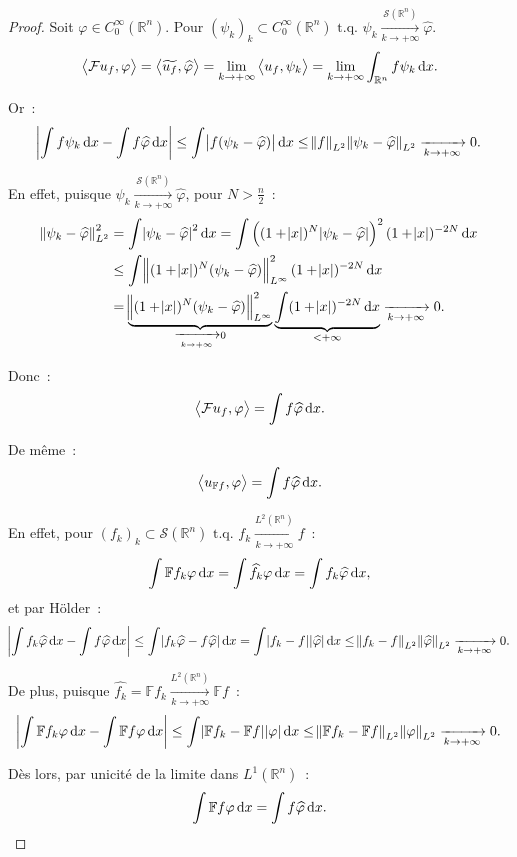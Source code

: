 \documentclass{report}
\newcommand{\R}{{\mathbb R}}
\newcommand{\scpr}[2]{\left\langle#1, #2\right\rangle}
\newcommand{\tq}{\text{ t.q. }}
\newcommand{\st}{\tq}
\newcommand{\pinfty}{{+\infty}}
\theoremstyle{definition}
\theoremstyle{remark}
\begin{document}
\begin{proof} Soit $\varphi \in C^\infty_0(\R^n)$. Pour $(\psi_k)_k \subset C^\infty_0(\R^n) \st \psi_k \xrightarrow[k \to \pinfty]{\mathcal S(\R^n)} \widehat {\varphi}$.
\[\scpr {\mathcal Fu_f}\varphi = \scpr {\widetilde {u_f}}{\widehat \varphi} = \lim_{k \to \pinfty}\scpr {u_f}{\psi_k} = \lim_{k \to \pinfty}\int_{\R^n}f\psi_k\dif x.\]

Or~:
\[\abs {\int f\psi_k\dif x - \int f\widehat \varphi\dif x} \leq \int\abs {f(\psi_k - \widehat \varphi)}\dif x
	\leq \norm f_{L^2}\norm {\psi_k-\widehat \varphi}_{L^2} \xrightarrow[k \to \pinfty]{} 0.\]

En effet, puisque $\psi_k \xrightarrow[k \to \pinfty]{\mathcal S(\R^n)} \widehat \varphi$, pour $N > \frac n2$~:
\begin{align*}
	\norm {\psi_k - \widehat \varphi}_{L^2}^2 &= \int\abs {\psi_k-\widehat \varphi}^2\dif x = \int\left((1+\abs x)^N\abs {\psi_k-\widehat \varphi}\right)^2(1+\abs x)^{-2N}\dif x \\
	&\leq \int\norm {(1+\abs x)^N(\psi_k-\widehat\varphi)}_{L^\infty}^2(1+\abs x)^{-2N}\dif x \\
	&= \underbrace {\norm {(1+\abs x)^N(\psi_k-\widehat\varphi)}_{L^\infty}^2}_{\xrightarrow[k \to \pinfty]{} 0}\underbrace{\int(1+\abs x)^{-2N}\dif x}_{< \pinfty}
		\xrightarrow[k \to \pinfty]{} 0.
\end{align*}

Donc~:
\[\scpr {\mathcal Fu_f}\varphi = \int f\widehat \varphi\dif x.\]

De même~:
\[\scpr {u_{\mathbb Ff}}\varphi = \int f\widehat \varphi\dif x.\]

En effet, pour $(f_k)_k \subset \mathcal S(\R^n) \st f_k \xrightarrow[k \to \pinfty]{L^2(\R^n)} f$~:
\[\int\mathbb Ff_k\varphi\dif x = \int\widehat {f_k}\varphi\dif x = \int f_k\widehat \varphi\dif x,\]
et par Hölder~:
\[\abs {\int f_k\widehat\varphi\dif x - \int f\widehat\varphi\dif x} \leq \int\abs {f_k\widehat \varphi - f\widehat \varphi}\dif x = \int\abs {f_k-f}\abs{\widehat \varphi}\dif x
\leq \norm {f_k-f}_{L^2}\norm {\widehat \varphi}_{L^2} \xrightarrow[k \to \pinfty]{} 0.\]

De plus, puisque $\widehat {f_k} = \mathbb Ff_k \xrightarrow[k \to \pinfty]{L^2(\R^n)} \mathbb Ff$~:
\[\abs {\int \mathbb Ff_k\varphi\dif x - \int\mathbb Ff\varphi\dif x} \leq \int\abs {\mathbb Ff_k-\mathbb Ff}\abs \varphi\dif x
\leq \norm {\mathbb Ff_k-\mathbb Ff}_{L^2}\norm \varphi_{L^2} \xrightarrow[k \to \pinfty]{} 0.\]

Dès lors, par unicité de la limite dans $L^1(\R^n)$~:
\[\int\mathbb Ff\varphi\dif x = \int f\widehat \varphi\dif x.\]
\end{proof}
\end{document}

